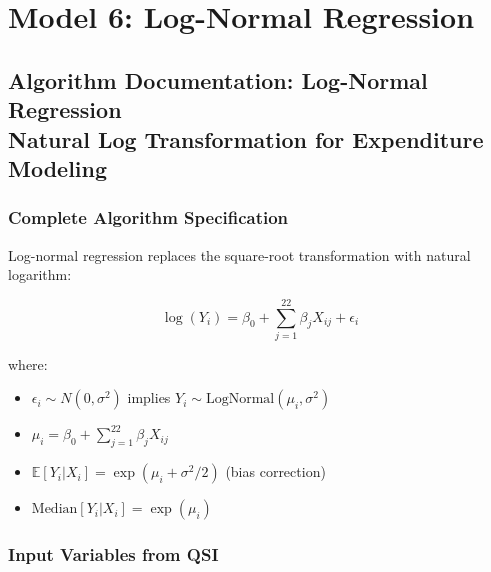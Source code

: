 \chapter{Model 6: Log-Normal Regression}\newpage

\section{Algorithm Documentation: Log-Normal Regression\\Natural Log Transformation for Expenditure Modeling}

\subsection{Complete Algorithm Specification}

Log-normal regression replaces the square-root transformation with natural logarithm:

\begin{equation}
\log(Y_i) = \beta_0 + \sum_{j=1}^{22} \beta_j X_{ij} + \epsilon_i
\end{equation}

where:
\begin{itemize}
    \item $\epsilon_i \sim N(0, \sigma^2)$ implies $Y_i \sim \text{LogNormal}(\mu_i, \sigma^2)$
    \item $\mu_i = \beta_0 + \sum_{j=1}^{22} \beta_j X_{ij}$
    \item $\mathbb{E}[Y_i | X_i] = \exp(\mu_i + \sigma^2/2)$ (bias correction)
    \item $\text{Median}[Y_i | X_i] = \exp(\mu_i)$
\end{itemize}

\subsection{Input Variables from QSI}

